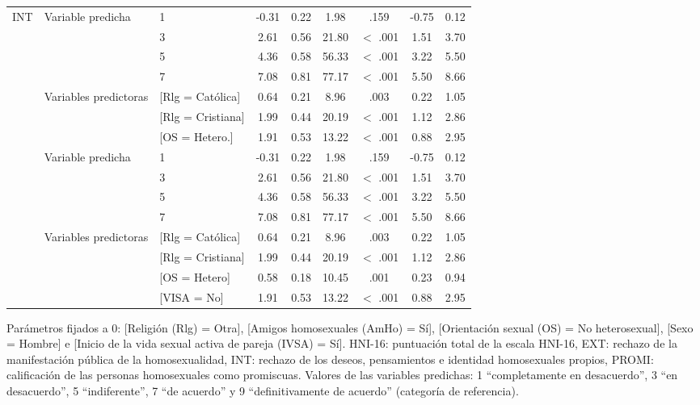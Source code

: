 \documentclass[a4paper, 11pt]{article}
\begin{document}
\begin{table}[h]
\begin{tabular}{c p{} lcccccc}
\multirow{8}{*}{INT} & \multirow{4}{2cm}{Variable predicha}& 1 & -0.31 & 0.22 & 1.98 & .159 & -0.75 &0.12 \\
& & 3 & 2.61 & 0.56 & 21.80 & \(<\) .001 & 1.51 & 3.70 \\
&& 5 & 4.36 & 0.58 & 56.33 & \(<\) .001 & 3.22 & 5.50 \\
&& 7 & 7.08 & 0.81 & 77.17 & \(<\) .001 & 5.50 & 8.66 \\

& \multirow{3}{2cm}{Variables predictoras} & [Rlg = Católica] & 0.64 & 0.21 & 8.96 & .003 & 0.22 & 1.05 \\
&& [Rlg = Cristiana] & 1.99 & 0.44 & 20.19 & \(<\) .001 & 1.12 & 2.86 \\
&& [OS = Hetero.] & 1.91 & 0.53 & 13.22 & \(<\) .001 & 0.88 & 2.95 \\

\multirow{8}{*}{PROMI} & \multirow{4}{2cm}{Variable predicha}& 1 & -0.31 & 0.22 & 1.98 & .159 & -0.75 &0.12 \\
& & 3 & 2.61 & 0.56 & 21.80 & \(<\) .001 & 1.51 & 3.70 \\
&& 5 & 4.36 & 0.58 & 56.33 & \(<\) .001 & 3.22 & 5.50 \\
&& 7 & 7.08 & 0.81 & 77.17 & \(<\) .001 & 5.50 & 8.66 \\

& \multirow{4}{2cm}{Variables predictoras} & [Rlg = Católica] & 0.64 & 0.21 & 8.96 & .003 & 0.22 & 1.05 \\
&& [Rlg = Cristiana] & 1.99 & 0.44 & 20.19 & \(<\) .001 & 1.12 & 2.86 \\
&& [OS = Hetero] & 0.58 & 0.18 & 10.45 & .001 & 0.23 & 0.94 \\
&& [VISA = No] & 1.91 & 0.53 & 13.22 & \(<\) .001 & 0.88 & 2.95 \\
\hline
\end{tabular}
\label{tabla:03}
\end{table}
Parámetros fijados a 0: [Religión (Rlg) = Otra], [Amigos homosexuales (AmHo) = Sí], [Orientación
sexual (OS) = No heterosexual], [Sexo = Hombre] e [Inicio de la vida sexual activa de pareja (IVSA)
= Sí]. HNI-16: puntuación total de la escala HNI-16, EXT: rechazo de la manifestación pública de la
homosexualidad, INT: rechazo de los deseos, pensamientos e identidad homosexuales propios,
PROMI: calificación de las personas homosexuales como promiscuas. Valores de las variables
predichas: 1 “completamente en desacuerdo”, 3 “en desacuerdo”, 5 “indiferente”, 7 “de acuerdo” y
9 “definitivamente de acuerdo” (categoría de referencia).
\end{document}
